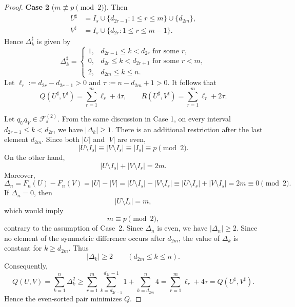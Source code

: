 \documentclass[10pt,a4paper]{amsart}
\begin{document}
\begin{proof}
\medskip

\noindent
{\bf Case 2} (\(m\not\equiv p\pmod2\)). 
Then
\begin{align*}
U^\sharp
&=I_s\cup\{d_{2r-1}:1\le r\le m\}\cup\{d_{2m}\},\\
V^\sharp
&=I_s\cup\{d_{2r}:1\le r\le m-1\}.
\end{align*}
Hence $\Delta_k^\sharp$
is given by
\[
 \Delta_k^\sharp=
 \begin{cases}
1, & d_{2r-1}\le k<d_{2r}
    \text{ for some }r,\\
0, & d_{2r}\le k<d_{2r+1}
    \text{ for some }r<m,\\
2, & d_{2m}\le k\le n.
 \end{cases}
\]
Let $\ell_r:=d_{2r}-d_{2r-1}>0$ and $\tau:=n-d_{2m}+1>0$. It follows that
\[
Q(U^\sharp,V^\sharp) =
 \sum_{r=1}^m\ell_r+4\tau,
 \qquad
R(U^\sharp,V^\sharp) =
 \sum_{r=1}^m\ell_r+2\tau.
\]

Let $q_Uq_V\in\mathcal{F}^{(2)}_s$.
From the same discussion in Case 1,
on every interval
$d_{2r-1}\le k<d_{2r}$,
we have $|\Delta_k|\ge1$.
There is an additional restriction after the last element
\(d_{2m}\).  Since both \(|U|\) and \(|V|\) are even,
\[
|U\setminus I_s|\equiv |V\setminus I_s|
 \equiv |I_s|
 \equiv p
 \pmod2.
\]
On the other hand,
\[
|U\setminus I_s|+|V\setminus I_s|=2m.
\]
Moreover,
\[
 \Delta_n
=
F_n(U) - F_n(V)
= |U|-|V| 
= |U \setminus I_s|-|V \setminus I_s| 
\equiv |U \setminus I_s|+|V \setminus I_s| 
=2m
\equiv0
\pmod 2.
\]
If \(\Delta_n=0\), then
\[
|U\setminus I_s|=m,
\]
which would imply
\[
m\equiv p\pmod2,
\]
contrary to the assumption of Case~2. 
Since $\Delta_n$ is even,
we have $|\Delta_n|\ge2$.
Since no element of the symmetric difference occurs after \(d_{2m}\), the value of \(\Delta_k\) is constant for \(k\ge d_{2m}\). Thus
\[
|\Delta_k|\ge2
 \qquad(d_{2m}\le k\le n).
\]
Consequently,
\[
Q(U,V) =
 \sum_{k=1}^n\Delta_k^2
\ge
 \sum_{r=1}^m
 \sum_{k=d_{2r-1}}^{d_{2r}-1}1
+
 \sum_{k=d_{2m}}^n4
=
 \sum_{r=1}^m\ell_r+4\tau
= Q(U^\sharp,V^\sharp).
\]
Hence the even-sorted pair minimizes $Q$.


\end{proof}
\end{document}
